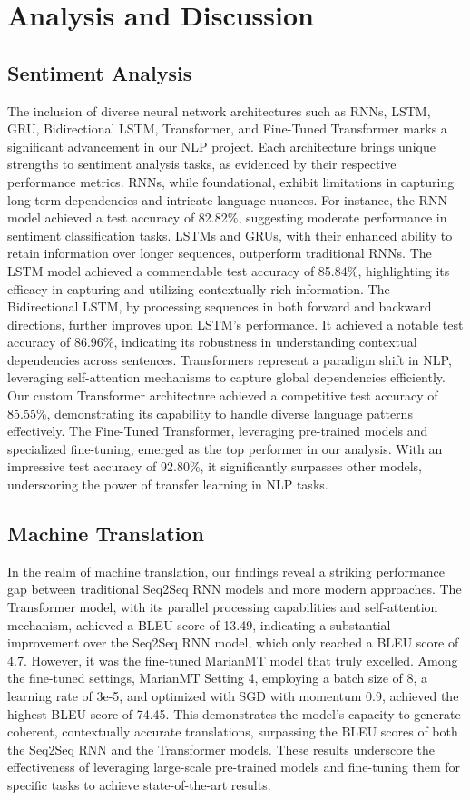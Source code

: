 \documentclass{article}
\begin{document}
\section{Analysis and Discussion}
\subsection{Sentiment Analysis}
The inclusion of diverse neural network architectures such as RNNs, LSTM, GRU, Bidirectional LSTM, Transformer, and Fine-Tuned Transformer marks a significant advancement in our NLP project. Each architecture brings unique strengths to sentiment analysis tasks, as evidenced by their respective performance metrics. RNNs, while foundational, exhibit limitations in capturing long-term dependencies and intricate language nuances. For instance, the RNN model achieved a test accuracy of 82.82\%, suggesting moderate performance in sentiment classification tasks. LSTMs and GRUs, with their enhanced ability to retain information over longer sequences, outperform traditional RNNs. The LSTM model achieved a commendable test accuracy of 85.84\%, highlighting its efficacy in capturing and utilizing contextually rich information. The Bidirectional LSTM, by processing sequences in both forward and backward directions, further improves upon LSTM's performance. It achieved a notable test accuracy of 86.96\%, indicating its robustness in understanding contextual dependencies across sentences. Transformers represent a paradigm shift in NLP, leveraging self-attention mechanisms to capture global dependencies efficiently. Our custom Transformer architecture achieved a competitive test accuracy of 85.55\%, demonstrating its capability to handle diverse language patterns effectively. The Fine-Tuned Transformer, leveraging pre-trained models and specialized fine-tuning, emerged as the top performer in our analysis. With an impressive test accuracy of 92.80\%, it significantly surpasses other models, underscoring the power of transfer learning in NLP tasks.

\subsection{Machine Translation}
In the realm of machine translation, our findings reveal a striking performance gap between traditional Seq2Seq RNN models and more modern approaches. The Transformer model, with its parallel processing capabilities and self-attention mechanism, achieved a BLEU score of 13.49, indicating a substantial improvement over the Seq2Seq RNN model, which only reached a BLEU score of 4.7. However, it was the fine-tuned MarianMT model that truly excelled. Among the fine-tuned settings, MarianMT Setting 4, employing a batch size of 8, a learning rate of 3e-5, and optimized with SGD with momentum 0.9, achieved the highest BLEU score of 74.45. This demonstrates the model's capacity to generate coherent, contextually accurate translations, surpassing the BLEU scores of both the Seq2Seq RNN and the Transformer models. These results underscore the effectiveness of leveraging large-scale pre-trained models and fine-tuning them for specific tasks to achieve state-of-the-art results.
\end{document}
